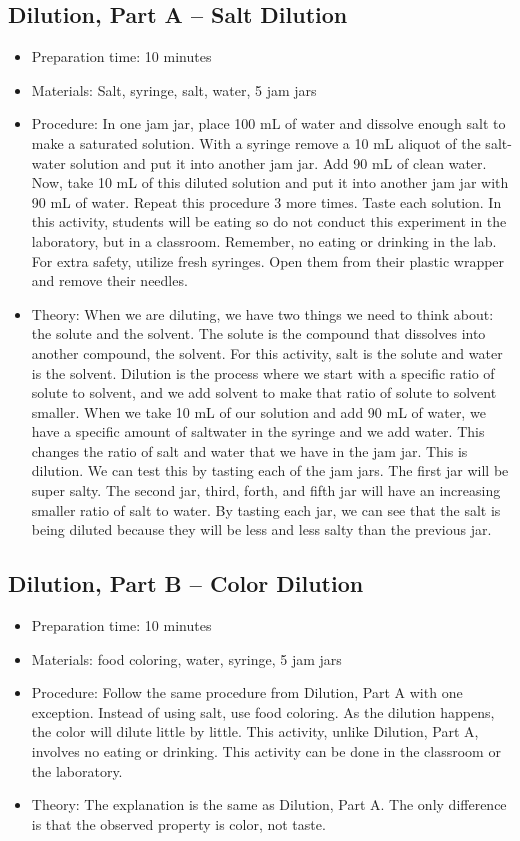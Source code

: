\subsection{Dilution, Part A – Salt Dilution}
\begin{itemize}
\item{Preparation time: 10 minutes}
\item{Materials: Salt, syringe, salt, water, 5 jam jars}
\item{Procedure: In one jam jar, place 100 mL of water and dissolve enough salt to make a saturated solution. With a syringe remove a 10 mL aliquot of the salt-water solution and put it into another jam jar. Add 90 mL of clean water. Now, take 10 mL of this diluted solution and put it into another jam jar with 90 mL of water. Repeat this procedure 3 more times. Taste each solution. In this activity, students will be eating so do not conduct this experiment in the laboratory, but in a classroom. Remember, no eating or drinking in the lab. For extra safety, utilize fresh syringes. Open them from their plastic wrapper and remove their needles.}
\item{Theory: When we are diluting, we have two things we need to think about: the solute and the solvent. The solute is the compound that dissolves into another compound, the solvent. For this activity, salt is the solute and water is the solvent. Dilution is the process where we start with a specific ratio of solute to solvent, and we add solvent to make that ratio of solute to solvent smaller. When we take 10 mL of our solution and add 90 mL of water, we have a specific amount of saltwater in the syringe and we add water. This changes the ratio of salt and water that we have in the jam jar. This is dilution. We can test this by tasting each of the jam jars. The first jar will be super salty. The second jar, third, forth, and fifth jar will have an increasing smaller ratio of salt to water. By tasting each jar, we can see that the salt is being diluted because they will be less and less salty than the previous jar.}
\end{itemize}

\subsection{Dilution, Part B – Color Dilution}
\begin{itemize}
\item{Preparation time: 10 minutes}
\item{Materials: food coloring, water, syringe, 5 jam jars}
\item{Procedure: Follow the same procedure from Dilution, Part A with one exception. Instead of using salt, use food coloring. As the dilution happens, the color will dilute little by little. This activity, unlike Dilution, Part A, involves no eating or drinking. This activity can be done in the classroom or the laboratory.}
\item{Theory: The explanation is the same as Dilution, Part A. The only difference is that the observed property is color, not taste.}
\end{itemize}

